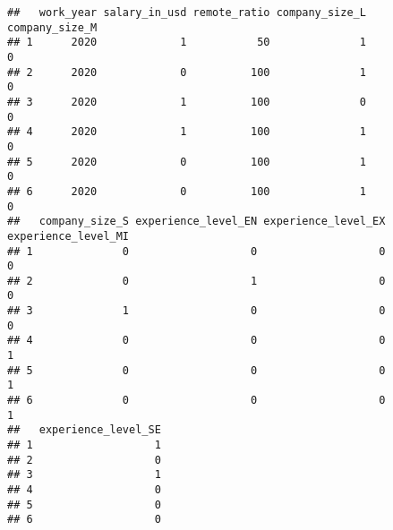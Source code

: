 \documentclass[
]{article}
\newenvironment{Shaded}{\begin{snugshade}}{\end{snugshade}}
\newcommand{\AttributeTok}[1]{\textcolor[rgb]{0.77,0.63,0.00}{#1}}
\newcommand{\ConstantTok}[1]{\textcolor[rgb]{0.00,0.00,0.00}{#1}}
\newcommand{\DecValTok}[1]{\textcolor[rgb]{0.00,0.00,0.81}{#1}}
\newcommand{\FloatTok}[1]{\textcolor[rgb]{0.00,0.00,0.81}{#1}}
\newcommand{\FunctionTok}[1]{\textcolor[rgb]{0.00,0.00,0.00}{#1}}
\newcommand{\NormalTok}[1]{#1}
\newcommand{\OtherTok}[1]{\textcolor[rgb]{0.56,0.35,0.01}{#1}}
\newcommand{\SpecialCharTok}[1]{\textcolor[rgb]{0.00,0.00,0.00}{#1}}
\begin{document}
\begin{verbatim}
##   work_year salary_in_usd remote_ratio company_size_L company_size_M
## 1      2020             1           50              1              0
## 2      2020             0          100              1              0
## 3      2020             1          100              0              0
## 4      2020             1          100              1              0
## 5      2020             0          100              1              0
## 6      2020             0          100              1              0
##   company_size_S experience_level_EN experience_level_EX experience_level_MI
## 1              0                   0                   0                   0
## 2              0                   1                   0                   0
## 3              1                   0                   0                   0
## 4              0                   0                   0                   1
## 5              0                   0                   0                   1
## 6              0                   0                   0                   1
##   experience_level_SE
## 1                   1
## 2                   0
## 3                   1
## 4                   0
## 5                   0
## 6                   0
\end{verbatim}

\begin{Shaded}
\end{Shaded}
\end{document}
